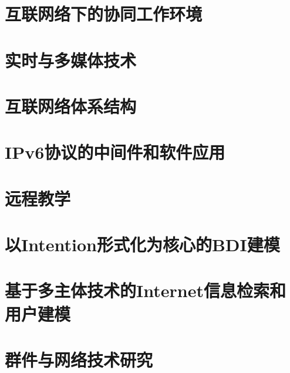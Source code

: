 \section{互联网络下的协同工作环境}
\section{实时与多媒体技术}
\section{互联网络体系结构}
\section{IPv6协议的中间件和软件应用}
\section{远程教学}
\section{以Intention形式化为核心的BDI建模}
\section{基于多主体技术的Internet信息检索和用户建模}
\section{群件与网络技术研究}

